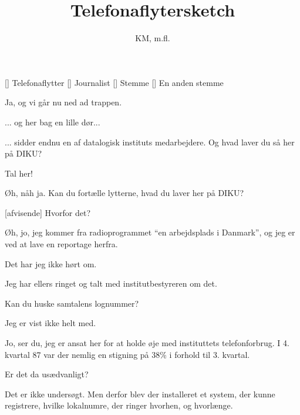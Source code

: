 \documentclass[a4paper,11pt]{article}
\title{Telefonaflytersketch}
\author{KM, m.fl.}
\begin{document}
\maketitle

\begin{roles}
[] Telefonaflytter
[] Journalist
[] Stemme
[] En anden stemme
\end{roles}

\begin{sketch}


   Ja, og vi går nu ned ad trappen.


   ... og her bag en lille dør...


   ... sidder endnu en af datalogisk instituts medarbejdere.
   Og hvad laver du så her på DIKU?

   Tal her! 

   Øh, nåh ja.  Kan du fortælle lytterne, hvad du laver her på DIKU?

  [afvisende] Hvorfor det?

   Øh, jo, jeg kommer fra radioprogrammet "`en arbejdsplads i
  Danmark"', og jeg er ved at lave en reportage herfra.

   Det har jeg ikke hørt om.

   Jeg har ellers ringet og talt med institutbestyreren om
  det.

   Kan du huske samtalens lognummer?

   Jeg er vist ikke helt med.

   Jo, ser du, jeg er ansat her for at holde øje med
  instituttets telefonforbrug.  I 4. kvartal 87 var der nemlig en
  stigning på 38\% i forhold til 3. kvartal.

   Er det da usædvanligt?

   Det er ikke undersøgt.  Men derfor blev der installeret et
  system, der kunne registrere, hvilke lokalnumre, der ringer hvorhen,
  og hvorlænge.


\end{sketch}
\end{document}
